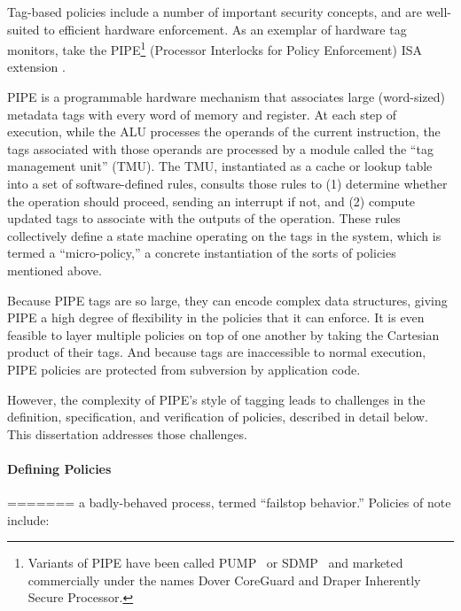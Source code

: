 \documentclass{report}
\begin{document}
Tag-based policies include a number of important security concepts, and are well-suited to
efficient hardware enforcement. As an exemplar of hardware tag monitors, take the 
PIPE\footnote{ Variants of PIPE have
been called PUMP~\cite{Dhawan+15} or SDMP~\cite{RoesslerD18} and marketed commercially
under the names Dover CoreGuard and Draper Inherently Secure Processor.}
(Processor Interlocks for Policy Enforcement) ISA extension \cite{Azevedo+16,Azevedo+15}.

PIPE is a programmable hardware mechanism that associates large (word-sized) metadata tags
with every word of memory and register. At each step of execution, while the ALU processes
the operands of the current instruction, the tags associated with those operands are processed
by a module called the ``tag management unit'' (TMU).
The TMU, instantiated as a cache or lookup table into a set of software-defined rules,
consults those rules to (1) determine whether the operation should
proceed, sending an interrupt if not, and (2) compute updated tags to associate with the
outputs of the operation. These rules collectively define a state machine operating on the
tags in the system, which is termed a ``micro-policy,'' a concrete instantiation of the
sorts of policies mentioned above.

Because PIPE tags are so large, they can encode complex data structures, giving PIPE a high
degree of flexibility in the policies that it can enforce. It is even feasible to layer
multiple policies on top of one another by taking the Cartesian product of their tags.
And because tags are inaccessible to normal execution, PIPE policies are protected from
subversion by application code.

However, the complexity of PIPE's style of tagging leads to challenges in the definition,
specification, and verification of policies, described in detail below. This dissertation
addresses those challenges.

\paragraph{Defining Policies}

=======
a badly-behaved process, termed ``failstop behavior.'' Policies of note include:
\end{document}
